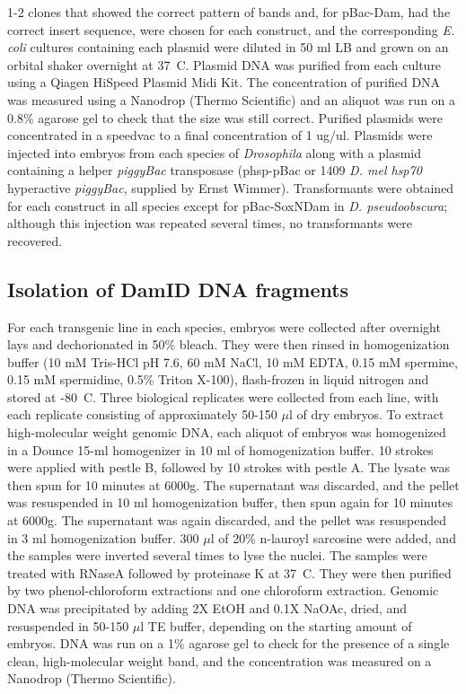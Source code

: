 1-2 clones that showed the correct pattern of bands and, for pBac-Dam, had the correct insert sequence, were chosen for each construct, and the corresponding \emph{E. coli} cultures containing each plasmid were diluted in 50 ml LB and grown on an orbital shaker overnight at 37\degree~C. Plasmid DNA was purified from each culture using a Qiagen HiSpeed Plasmid Midi Kit. The concentration of purified DNA was measured using a Nanodrop (Thermo Scientific) and an aliquot was run on a 0.8\% agarose gel to check that the size was still correct. Purified plasmids were concentrated in a speedvac to a final concentration of 1 ug/ul. Plasmids were injected into embryos from each species of \emph{Drosophila} along with a plasmid containing a helper \emph{piggyBac} transposase (phsp-pBac or 1409 \emph{D. mel hsp70} hyperactive \emph{piggyBac}, supplied by Ernst Wimmer). Transformants were obtained for each construct in all species except for pBac-SoxNDam in \emph{D. pseudoobscura}; although this injection was repeated several times, no transformants were recovered.

\subsection{Isolation of DamID DNA fragments}
For each transgenic line in each species, embryos were collected after overnight lays and dechorionated in 50\% bleach. They were then rinsed in homogenization buffer (10 mM Tris-HCl pH 7.6, 60 mM NaCl, 10 mM EDTA, 0.15 mM spermine, 0.15 mM spermidine, 0.5\% Triton X-100), flash-frozen in liquid nitrogen and stored at -80\degree~C. Three biological replicates were collected from each line, with each replicate consisting of approximately 50-150 \(\mu\)l of dry embryos. To extract high-molecular weight genomic DNA, each aliquot of embryos was homogenized in a Dounce 15-ml homogenizer in 10 ml of homogenization buffer. 10 strokes were applied with pestle B, followed by 10 strokes with pestle A. The lysate was then spun for 10 minutes at 6000g. The supernatant was discarded, and the pellet was resuspended in 10 ml homogenization buffer, then spun again for 10 minutes at 6000g. The supernatant was again discarded, and the pellet was resuspended in 3 ml homogenization buffer. 300 \(\mu\)l of 20\% n-lauroyl sarcosine were added, and the samples were inverted several times to lyse the nuclei. The samples were treated with RNaseA followed by proteinase K at 37\degree~C. They were then purified by two phenol-chloroform extractions and one chloroform extraction. Genomic DNA was precipitated by adding 2X EtOH and 0.1X NaOAc, dried, and resuspended in 50-150 \(\mu\)l TE buffer, depending on the starting amount of embryos. DNA was run on a 1\% agarose gel to check for the presence of a single clean, high-molecular weight band, and the concentration was measured on a Nanodrop (Thermo Scientific).\\

